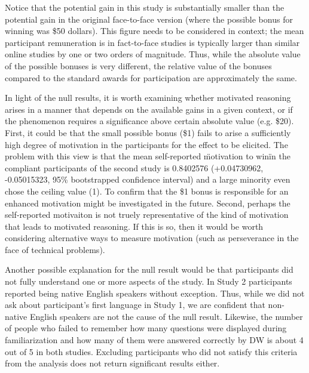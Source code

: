 \documentclass{article}
\begin{document}
Notice that the potential gain in this study is substantially smaller than the potential gain in the original face-to-face version (where the possible bonus for winning was \$50 dollars). This figure needs to be considered in context; the mean participant remuneration is in fact-to-face studies is typically larger than similar online studies by one or two orders of magnitude. Thus, while the absolute value of the possible bonuses is very different, the relative value of the bonuses compared to the standard awards for participation are approximately the same. 

In light of the null results, it is worth examining whether motivated reasoning arises in a manner that depends on the available gains in a given context, or if the phenomenon requires a significance above certain absolute value (e.g. \$20). First, it could be that the small possible bonus (\$1) fails to arise a sufficiently high degree of motivation in the participants for the effect to be elicited. The problem with this view is that the mean self-reported \"motivation to win\" in the compliant participants of the second study is 0.8402576 (+0.04730962, -0.05015323, 95\% bootstrapped confidence interval) and a large minority even chose the ceiling value (1). To confirm that the \$1 bonus is responsible for an enhanced motivation might be investigated in the future. Second, perhaps the self-reported motivaiton is not truely representative of the kind of motivation that leads to motivated reasoning. If this is so, then it would be worth considering alternative ways to measure motivation (such as perseverance in the face of technical problems).

Another possible explanation for the null result would be that participants did not fully understand one or more aspects of the study. In Study 2 participants reported being native English speakers without exception. Thus, while we did not ask about participant's first language in Study 1, we are confident that non-native English speakers are not the cause of the null result. Likewise, the number of people who failed to remember how many questions were displayed during familiarization and how many of them were answered correctly by DW is about 4 out of 5 in both studies. Excluding participants who did not satisfy this criteria from the analysis does not return significant results either. 
\end{document}
